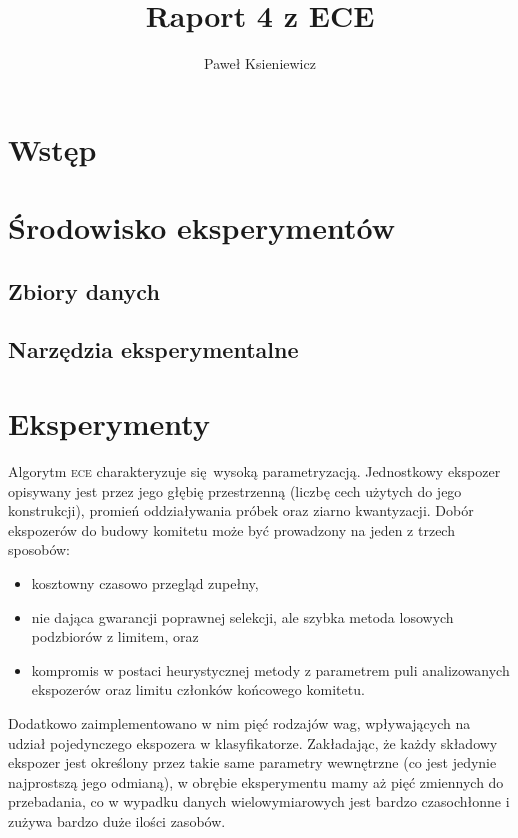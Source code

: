 \documentclass[]{article}
\title{Raport 4 z ECE}
\author{Paweł Ksieniewicz}
\begin{document}



\newpage

\section{Wstęp}


\section{Środowisko eksperymentów}
	\subsection{Zbiory danych}
	
	
	\subsection{Narzędzia eksperymentalne}
	

\section{Eksperymenty}

Algorytm \textsc{ece} charakteryzuje się wysoką parametryzacją. Jednostkowy ekspozer opisywany jest przez jego głębię przestrzenną (liczbę cech użytych do jego konstrukcji), promień oddziaływania próbek oraz ziarno kwantyzacji. Dobór ekspozerów do budowy komitetu może być prowadzony na jeden z trzech sposobów:
	\begin{itemize}
		\item kosztowny czasowo przegląd zupełny, 
		\item nie dająca gwarancji poprawnej selekcji, ale szybka metoda losowych podzbiorów z limitem, oraz
		\item kompromis w postaci heurystycznej metody z parametrem puli analizowanych ekspozerów oraz limitu członków końcowego komitetu.
	\end{itemize}
	
Dodatkowo zaimplementowano w nim pięć rodzajów wag, wpływających na udział pojedynczego ekspozera w klasyfikatorze. Zakładając, że każdy składowy ekspozer jest określony przez takie same parametry wewnętrzne (co jest jedynie najprostszą jego odmianą), w obrębie eksperymentu mamy aż pięć zmiennych do przebadania, co w wypadku danych wielowymiarowych jest bardzo czasochłonne i zużywa bardzo duże ilości zasobów.
\end{document}
